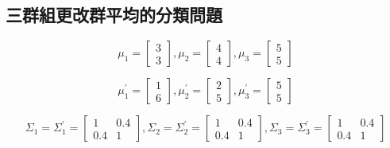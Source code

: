 \subsection{三群組更改群平均的分類問題}

$$ \mu_1 = \left[
            \begin{array}{clr}
                3  \\
                3 
            \end{array} \right] ,
            \mu_2 = \left[
            \begin{array}{clr}
                4  \\
                4 
            \end{array} \right],
            \mu_3 = \left[
            \begin{array}{clr}
                5  \\
                5 
            \end{array} \right]$$ 

$$ \mu_1^{'} = \left[
            \begin{array}{clr}
                1  \\
                6 
            \end{array} \right] ,
            \mu_2^{'} = \left[
            \begin{array}{clr}
                2  \\
                5 
            \end{array} \right],
            \mu_3^{'} = \left[
            \begin{array}{clr}
                5  \\
                5 
            \end{array} \right]$$ 

$$ \Sigma_1=\Sigma_1^{'} = \left[
            \begin{array}{clr}
                1 & 0.4  \\
                0.4 & 1
            \end{array} \right] ,
            \Sigma_2=\Sigma_2^{'} = \left[
            \begin{array}{clr}
                1 & 0.4  \\
                0.4 & 1 
            \end{array} \right]  ,
            \Sigma_3=\Sigma_3^{'} = \left[
            \begin{array}{clr}
                1 & 0.4  \\
                0.4 & 1 
            \end{array} \right] $$
            
